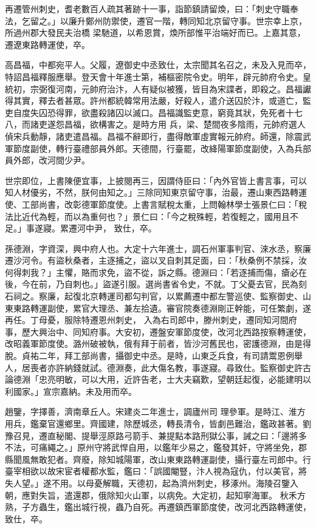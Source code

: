 \begin{pinyinscope}
 再遷管州刺史，耆老數百人疏其著跡十一事，詣節鎮請留煥，曰：「刺史守職奉法，乞留之。」以廉升鄭州防禦使，遷官一階，轉同知北京留守事。世宗幸上京，所過州郡大發民夫治橋
 梁馳道，以希恩賞，煥所部惟平治端好而已。上嘉其意，遷遼東路轉運使，卒。



 高昌福，中都宛平人。父履，遼御史中丞致仕，太宗聞其名召之，未及入見而卒，特詔昌福釋服應舉。登天會十年進士第，補樞密院令史。明年，辟元帥府令史。皇統初，宗弼復河南，元帥府治汴，人有疑似被獲，皆目為宋諜者，即殺之。昌福讞得其實，釋去者甚眾。許州都統韓常用法嚴，好殺人，遣介送囚於汴，或道亡，監吏自度失囚恐得罪，欲盡殺諸囚以滅口。昌福識監吏意，窮竟其狀，免死者十七八，而諸吏遂怨昌福，欲構害之。是時方用
 兵，梁、楚間夜多陰雨，元帥府選人偵宋兵動靜，諸吏遣昌福。昌福不辭即行，盡得敵軍虛實報元帥府。師還，除震武軍節度副使，轉行臺禮部員外郎。天德間，行臺罷，改絳陽軍節度副使，入為兵部員外郎，改河間少尹。



 世宗即位，上書陳便宜事，上披閱再三，因謂侍臣曰：「內外官皆上書言事，可以知人材優劣，不然，朕何由知之。」三除同知東京留守事，治最，遷山東西路轉運使、工部尚書，改彰德軍節度使。上書言賦稅太重，上問翰林學士張景仁曰：「稅法比近代為輕，而以為重何也？」景仁曰：「今之稅殊輕，若復輕之，國用且不足。」事遂寢。累遷河中尹，
 致仕，卒。



 孫德淵，字資深，興中府人也。大定十六年進士，調石州軍事判官、淶水丞，察廉遷沙河令。有盜秋桑者，主逐捕之，盜以叉自刺其足面，曰：「秋桑例不禁採，汝何得刺我？」主懼，賂而求免，盜不從，訴之縣。德淵曰：「若逐捕而傷，瘡必在後，今在前，乃自刺也。」盜遂引服。選尚書省令史，不就。丁父憂去官，民為刻石祠之。察廉，起復北京轉運司都勾判官，以累薦遷中都左警巡使、監察御史、山東東路轉運副使，累官大理丞、兼左拾遺。審官院奏德淵剛正幹能，可任繁劇，遂再任。丁母憂，服除特遷恩州刺史，
 入為右司郎中，滕州刺史，遷同知河間府事，歷大興治中、同知府事。大安初，遷盤安軍節度使，改河北西路按察轉運使，改昭義軍節度使。潞州破被執，俄有拜于前者，皆沙河舊民也，密護德淵，由是得脫。貞祐二年，拜工部尚書，攝御史中丞。是時，山東乏兵食，有司請鬻恩例舉人，居喪者亦許納錢就試。德淵奏，此大傷名教，事遂寢。尋致仕。監察御史許古論德淵「忠亮明敏，可以大用，近許告老，士大夫竊歎，望朝廷起復，必能建明以利國家。」宣宗嘉納。未及用而卒。



 趙鑒，字擇善，濟南章丘人。宋建炎二年進士，調廬州司
 理參軍。是時江、淮方用兵，鑑棄官還鄉里。齊國建，除歷城丞，轉長清令，皆劇邑難治，鑑政甚著。劉豫召見，遷直秘閣、提舉涇原路弓箭手、兼提點本路刑獄公事，誡之曰：「邊將多不法，可痛繩之。」原州守將武悍自用，以鑑年少易之，鑑發其奸，守將坐免，郡縣聞風無敢犯者。齊廢，除知城陽軍，改山東東路轉運副使，攝行臺左司郎中。行臺宰相欲以故宋宦者權都水監，鑑曰：「誤國閹豎，汴人視為寇仇，付以美官，將失人望。」遂不用。以母憂解職，天德初，起為濟州刺史，移涿州。海陵召鑒入朝，應對失旨，遣還郡，俄除知火山軍，以病免。大定初，起知寧海軍。
 秋禾方熟，子方蟲生，鑑出城行視，蟲乃自死。再遷鎮西軍節度使，改河北西路轉運使，致仕，卒。




\end{pinyinscope}
